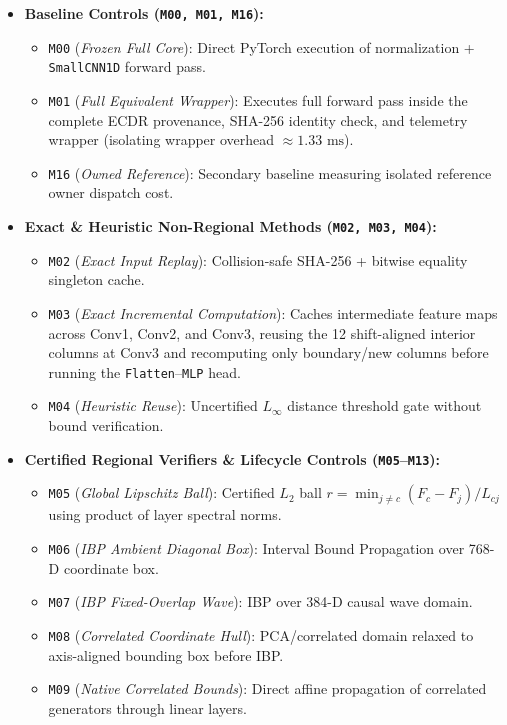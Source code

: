 \documentclass[11pt,a4paper]{article}
\newcommand{\code}[1]{{\small\ttfamily\nolinkurl{#1}}}
\theoremstyle{remark}
\begin{document}
\begin{itemize}
  \item \textbf{Baseline Controls (\code{M00, M01, M16}):}
    \begin{itemize}
      \item \code{M00} (\textit{Frozen Full Core}): Direct PyTorch execution of normalization + \code{SmallCNN1D} forward pass.
      \item \code{M01} (\textit{Full Equivalent Wrapper}): Executes full forward pass inside the complete ECDR provenance, SHA-256 identity check, and telemetry wrapper (isolating wrapper overhead $\approx 1.33\text{ ms}$).
      \item \code{M16} (\textit{Owned Reference}): Secondary baseline measuring isolated reference owner dispatch cost.
    \end{itemize}
  \item \textbf{Exact \& Heuristic Non-Regional Methods (\code{M02, M03, M04}):}
    \begin{itemize}
      \item \code{M02} (\textit{Exact Input Replay}): Collision-safe SHA-256 + bitwise equality singleton cache.
      \item \code{M03} (\textit{Exact Incremental Computation}): Caches intermediate feature maps across Conv1, Conv2, and Conv3, reusing the 12 shift-aligned interior columns at Conv3 and recomputing only boundary/new columns before running the \code{Flatten}--\code{MLP} head.
      \item \code{M04} (\textit{Heuristic Reuse}): Uncertified $L_\infty$ distance threshold gate without bound verification.
    \end{itemize}
  \item \textbf{Certified Regional Verifiers \& Lifecycle Controls (\code{M05}--\code{M13}):}
    \begin{itemize}
      \item \code{M05} (\textit{Global Lipschitz Ball}): Certified $L_2$ ball $r = \min_{j \neq c} (F_c - F_j) / L_{cj}$ using product of layer spectral norms.
      \item \code{M06} (\textit{IBP Ambient Diagonal Box}): Interval Bound Propagation over 768-D coordinate box.
      \item \code{M07} (\textit{IBP Fixed-Overlap Wave}): IBP over 384-D causal wave domain.
      \item \code{M08} (\textit{Correlated Coordinate Hull}): PCA/correlated domain relaxed to axis-aligned bounding box before IBP.
      \item \code{M09} (\textit{Native Correlated Bounds}): Direct affine propagation of correlated generators through linear layers.

\end{itemize}
\end{itemize}
\end{document}
